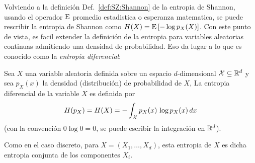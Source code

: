 
\label{sec:SZ:Diferencial}

Volviendo a la definici\'on Def.~\ref{def:SZ:Shannon} de la entropia de Shannon,
usando el operador $\operatorname{E}$ promedio  estadistica o esperanza matematica, se puede
rescribir la entropia de Shannon como $H(X) = \operatorname{E}\left[ - \log p_X(X) \right]$.
Con este punto  de vista, es facil extender la definici\'on  de la entropia para
variables aleatorias continuas admitiendo  una densidad de probabilidad.  Eso da
lugar a lo que es conocido como la {\it entropia diferencial}:

\begin{definicion}\label{def:SZ:EntropiaDiferencial}
  Sea $X$ una  variable aleatoria definida sobre un  espacio $d$-dimensional $\mathcal{X}
  \subseteq \mathbb{R}^d$ y sea $p_X(x)$ la densidad (distribuci\'on) de probabilidad
  de $X$, La entropia diferencial de la variable $X$ es definida por
  \[
  H(p_X) = H(X) = - \int_{\mathcal{X}} p_X(x) \, \log p_X(x) \, dx
  \]
  (con la  convenci\'on $0 \log  0 = 0$,  se puede escribir la  integraci\'on en
  $\mathbb{R}^d$).
\end{definicion}
%
Como en el  caso discreto, para $X = (X_1,\ldots,X_d)$, esta  entropia de $X$ es
dicha entropia conjunta de los componentes $X_i$.

